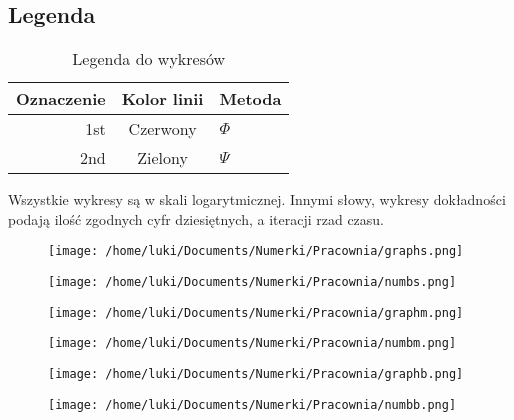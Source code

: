 \documentclass[11pt,wide]{mwart}
\begin{document}
\subsection{Legenda}
\begin{table}[h]
\centering
\begin{tabular}{r c l}
  \hline
  Oznaczenie & Kolor linii & Metoda\\
  \hline
  1st        & Czerwony    & $\Phi$\\
  2nd        & Zielony     & $\Psi$\\
  \hline
\end{tabular}
\label{tab:legendawykr}
\caption{Legenda do wykresów}
\end{table}
Wszystkie wykresy są w skali logarytmicznej. Innymi słowy, wykresy dokładności podają ilość zgodnych cyfr dziesiętnych, a iteracji rzad czasu.
\begin{figure}[h]
    \begin{minipage}[c]{0.5\linewidth}
        \texttt{[image: /home/luki/Documents/Numerki/Pracownia/graphs.png]} %
        \label{fig:graphs}
    \end{minipage}
    \begin{minipage}[c]{0.5\linewidth}
        \texttt{[image: /home/luki/Documents/Numerki/Pracownia/numbs.png]}
        \label{fig:numbs}
    \end{minipage}
\end{figure}
\begin{figure}[h]
    \begin{minipage}[c]{0.5\linewidth}
        \texttt{[image: /home/luki/Documents/Numerki/Pracownia/graphm.png]}
        \label{fig:graphm}
    \end{minipage}
    \begin{minipage}[c]{0.5\linewidth}
        \texttt{[image: /home/luki/Documents/Numerki/Pracownia/numbm.png]}
        \label{fig:numbm}
    \end{minipage}
\end{figure}
\begin{figure}[h]
    \begin{minipage}[c]{0.5\linewidth}
        \texttt{[image: /home/luki/Documents/Numerki/Pracownia/graphb.png]}
        \label{fig:graphb}
    \end{minipage}
    \begin{minipage}[c]{0.45\linewidth}
        \texttt{[image: /home/luki/Documents/Numerki/Pracownia/numbb.png]}
        \label{fig:numbb}
    \end{minipage}
\end{figure}
\end{document}
